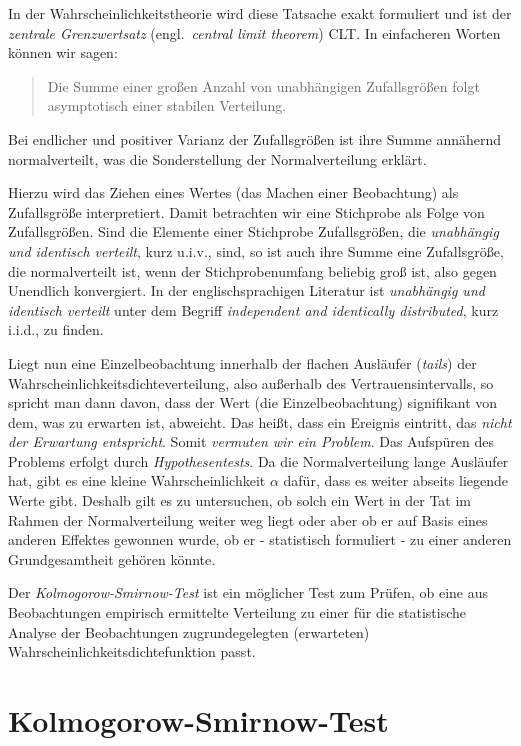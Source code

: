In der Wahrscheinlichkeitstheorie wird diese Tatsache exakt formuliert und ist der
\textsl{zentrale Grenzwertsatz} (engl.\ \textsl{central limit theorem}) CLT.
In einfacheren Worten können wir sagen:
\begin{quote}
Die Summe einer großen Anzahl von unabhängigen Zufallsgrößen folgt
asymptotisch einer stabilen Verteilung.
\end{quote}
Bei endlicher und positiver Varianz der Zufallsgrößen ist ihre Summe annähernd
normalverteilt, was die Sonderstellung der Normalverteilung erklärt.

Hierzu wird das Ziehen eines Wertes (das Machen einer Beobachtung) als Zufallsgröße
interpretiert.
Damit betrachten wir eine Stichprobe als Folge von Zufallsgrößen. Sind die Elemente
einer Stichprobe Zufallsgrößen, die
\textsl{unabhängig und identisch verteilt}, kurz u.i.v., sind, so ist auch ihre Summe
eine Zufallsgröße, die normalverteilt ist, wenn der Stichprobenumfang beliebig groß ist,
also gegen Unendlich konvergiert. In der englischsprachigen Literatur ist 
\textsl{unabhängig und identisch verteilt} unter dem Begriff
\textsl{independent and identically distributed}, kurz i.i.d., zu finden.

Liegt nun eine Einzelbeobachtung innerhalb der flachen
Ausläufer (\textsl{tails}) der Wahrscheinlichkeitsdichteverteilung,
also außerhalb des Vertrauensintervalls, so 
spricht man dann davon, dass der Wert (die Einzelbeobachtung)
signifikant von dem, was zu erwarten ist, abweicht. Das heißt, dass ein Ereignis eintritt,
das \textsl{nicht der Erwartung entspricht}. Somit \textsl{vermuten wir ein Problem}. Das Aufspüren
des Problems erfolgt durch \textsl{Hypothesentests}. Da die Normalverteilung
lange Ausläufer hat, gibt es eine kleine Wahrscheinlichkeit $\alpha$ dafür, dass es
weiter abseits liegende Werte gibt. Deshalb gilt es zu untersuchen,
ob solch ein Wert in der Tat im Rahmen der Normalverteilung weiter weg liegt
oder aber ob er auf Basis eines anderen Effektes gewonnen
wurde, ob er - statistisch formuliert - zu einer anderen Grundgesamtheit gehören könnte.

Der \textsl{Kolmogorow-Smirnow-Test} ist ein möglicher Test zum Prüfen, ob eine aus Beobachtungen
empirisch ermittelte Verteilung zu einer für die statistische Analyse der Beobachtungen
zugrundegelegten (erwarteten) Wahrscheinlichkeitsdichtefunktion passt.


\section{Kolmogorow-Smirnow-Test}

